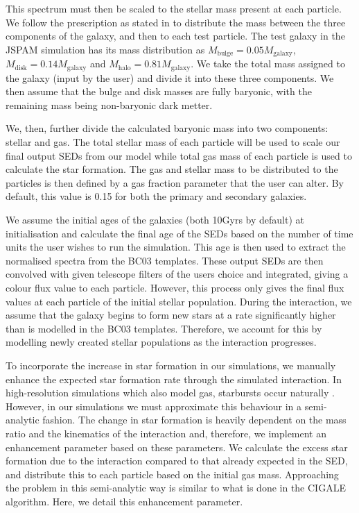 This spectrum must then be scaled to the stellar mass present at each particle. We follow the prescription as stated in \citet{2016A&C....16...26W} to distribute the mass between the three components of the galaxy, and then to each test particle. The test galaxy in the JSPAM simulation has its mass distribution as $M_{\text{bulge}} = 0.05M_{\text{galaxy}}$, $M_{\text{disk}} = 0.14M_{\text{galaxy}}$ and $M_{\text{halo}} = 0.81M_{\text{galaxy}}$. We take the total mass assigned to the galaxy (input by the user) and divide it into these three components. We then assume that the bulge and disk masses are fully baryonic, with the remaining mass being non-baryonic dark metter.

We, then, further divide the calculated baryonic mass into two components: stellar and gas. The total stellar mass of each particle will be used to scale our final output SEDs from our model while total gas mass of each particle is used to calculate the star formation. The gas and stellar mass to be distributed to the particles is then defined by a gas fraction parameter that the user can alter. By default, this value is 0.15 for both the primary and secondary galaxies.

We assume the initial ages of the galaxies (both 10Gyrs by default) at initialisation and calculate the final age of the SEDs based on the number of time units the user wishes to run the simulation. This age is then used to extract the normalised spectra from the BC03 templates. These output SEDs are then convolved with given telescope filters of the users choice and integrated, giving a colour flux value to each particle. However, this process only gives the final flux values at each particle of the initial stellar population. During the interaction, we assume that the galaxy begins to form new stars at a rate significantly higher than is modelled in the BC03 templates. Therefore, we account for this by modelling newly created stellar populations as the interaction progresses.

To incorporate the increase in star formation in our simulations, we manually enhance the expected star formation rate through the simulated interaction. In 
high-resolution simulations which also model gas, starbursts occur naturally \citep{2009PASJ...61..481S}. However, in our simulations we must approximate this behaviour in a semi-analytic fashion. The change in star formation is heavily dependent on the mass ratio and the kinematics of the interaction and, therefore, we implement an enhancement parameter based on these parameters. We calculate the excess star formation due to the interaction compared to that already expected in the SED, and distribute this to each particle based on the initial gas mass. Approaching the problem in this semi-analytic way is similar to what is done in the CIGALE \citep{2019A&A...622A.103B} algorithm. Here, we detail this enhancement parameter.

